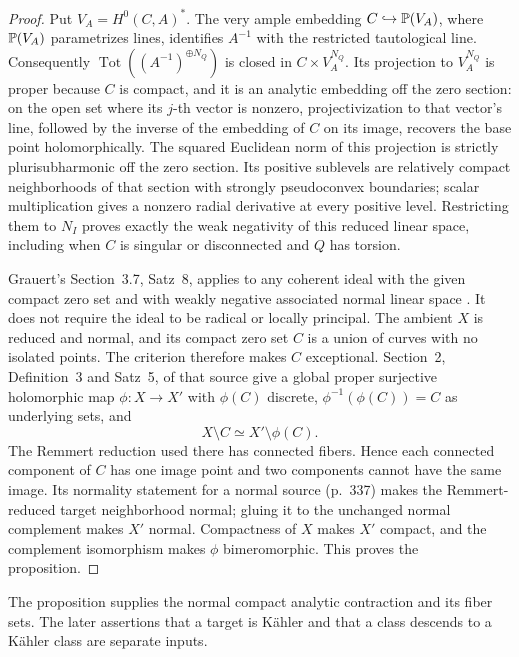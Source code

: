 \begin{proof}
Put \(V_A=H^0(C,A)^*\).  The very ample embedding
\(C\hookrightarrow\mathbb P(V_A)\), where \(\mathbb P(V_A)\) parametrizes lines,
identifies \(A^{-1}\) with the restricted
tautological line.  Consequently
\(\operatorname{Tot}((A^{-1})^{\oplus N_Q})\) is closed in
\(C\times V_A^{N_Q}\).  Its projection to \(V_A^{N_Q}\) is proper because \(C\)
is compact, and it is an analytic embedding off the zero section:
on the open set where its \(j\)-th vector is nonzero, projectivization
to that vector's line, followed by the inverse of the embedding of
\(C\) on its image, recovers the base point holomorphically.  The
squared Euclidean norm of this projection
is strictly plurisubharmonic off the zero section.  Its positive
sublevels are relatively compact neighborhoods of that section with
strongly pseudoconvex boundaries; scalar multiplication gives a nonzero
radial derivative at every positive level.  Restricting them to \(N_I\) proves
exactly the weak negativity of this reduced linear space, including
when \(C\) is singular or disconnected and \(Q\) has torsion.

Grauert's Section~3.7, Satz~8, applies to any coherent ideal with the
given compact zero set and with weakly negative associated normal
linear space \cite{Grauert1962}.  It does not require the ideal to be
radical or locally principal.  The ambient \(X\) is reduced and
normal, and its compact zero set \(C\) is a union of curves with no
isolated points.  The criterion therefore makes \(C\) exceptional.
Section~2, Definition~3 and Satz~5, of that source give a global proper
surjective holomorphic map \(\phi:X\to X'\) with \(\phi(C)\) discrete,
\(\phi^{-1}(\phi(C))=C\) as underlying sets, and
\[
 X\setminus C\simeq X'\setminus\phi(C).
\]
The Remmert reduction used there has connected fibers.  Hence each
connected component of \(C\) has one image point and two components
cannot have the same image.  Its normality statement for a normal source
(p.~337) makes the Remmert-reduced target neighborhood normal; gluing it to the
unchanged normal complement makes \(X'\) normal.  Compactness of \(X\)
makes \(X'\) compact, and the complement isomorphism makes \(\phi\)
bimeromorphic.  This proves the proposition.
\end{proof}

The proposition supplies the normal compact analytic contraction and
its fiber sets.  The later assertions that a target is K\"ahler and that
a class descends to a K\"ahler class are separate inputs.

